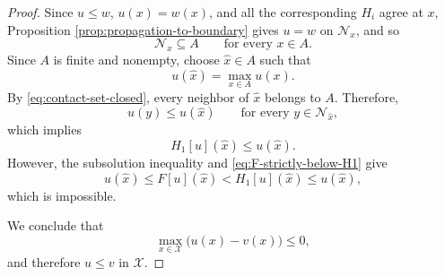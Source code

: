 \documentclass[10pt,a4paper]{amsart}
\begin{document}
\begin{proof}
Since \(u\leq w\), \(u(x)=w(x)\), and all the corresponding \(H_i\) agree at \(x\), Proposition \ref{prop:propagation-to-boundary} gives \(u=w\) on \(\mathcal N_x\), and so
\begin{equation}\label{eq:contact-set-closed}
    \mathcal N_x\subseteq A
    \qquad\text{for every }x\in A.
\end{equation}
Since \(A\) is finite and nonempty, choose
\(\widehat x\in A\) such that
\[
    u(\widehat x)=\max_{x\in A}u(x).
\]
By \eqref{eq:contact-set-closed}, every neighbor of \(\widehat x\)
belongs to \(A\). Therefore,
\[
    u(y)\leq u(\widehat x)
    \qquad\text{for every }y\in\mathcal N_{\widehat x},
\]
which implies
\[
    H_1[u](\widehat x)\leq u(\widehat x).
\]
However, the subsolution inequality and
\eqref{eq:F-strictly-below-H1} give
\[
    u(\widehat x)
    \leq
    F[u](\widehat x)
    <
    H_1[u](\widehat x)
    \leq
    u(\widehat x),
\]
which is impossible.

We conclude that
\[
    \max_{x\in\mathcal X}\bigl(u(x)-v(x)\bigr)\leq0,
\]
and therefore \(u\leq v\) in \(\mathcal X\).
\end{proof}
\end{document}
